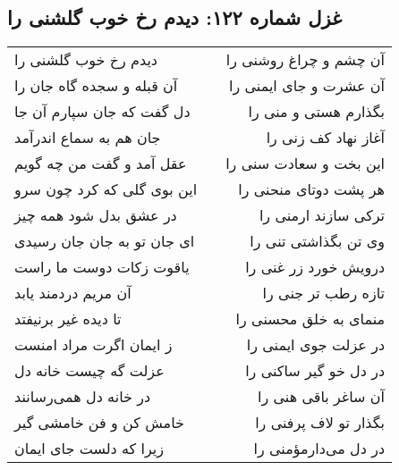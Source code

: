 \begin{center}
\section*{غزل شماره ۱۲۲: دیدم رخ خوب گلشنی را}
\label{sec:0122}
\begin{longtable}{l p{0.5cm} r}
دیدم رخ خوب گلشنی را
&&
آن چشم و چراغ روشنی را
\\
آن قبله و سجده گاه جان را
&&
آن عشرت و جای ایمنی را
\\
دل گفت که جان سپارم آن جا
&&
بگذارم هستی و منی را
\\
جان هم به سماع اندرآمد
&&
آغاز نهاد کف زنی را
\\
عقل آمد و گفت من چه گویم
&&
این بخت و سعادت سنی را
\\
این بوی گلی که کرد چون سرو
&&
هر پشت دوتای منحنی را
\\
در عشق بدل شود همه چیز
&&
ترکی سازند ارمنی را
\\
ای جان تو به جان جان رسیدی
&&
وی تن بگذاشتی تنی را
\\
یاقوت زکات دوست ما راست
&&
درویش خورد زر غنی را
\\
آن مریم دردمند یابد
&&
تازه رطب تر جنی را
\\
تا دیده غیر برنیفتد
&&
منمای به خلق محسنی را
\\
ز ایمان اگرت مراد امنست
&&
در عزلت جوی ایمنی را
\\
عزلت گه چیست خانه دل
&&
در دل خو گیر ساکنی را
\\
در خانه دل همی‌رسانند
&&
آن ساغر باقی هنی را
\\
خامش کن و فن خامشی گیر
&&
بگذار تو لاف پرفنی را
\\
زیرا که دلست جای ایمان
&&
در دل می‌دارمؤمنی را
\\
\end{longtable}
\end{center}
